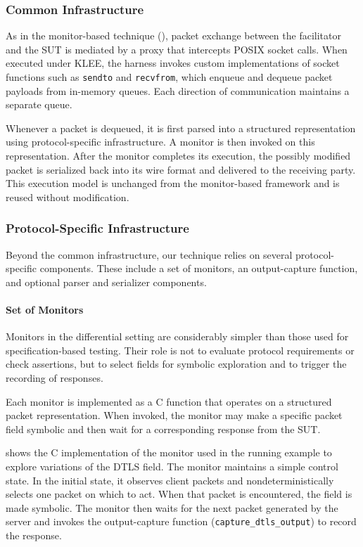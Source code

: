 \subsubsection{Common Infrastructure}\label{sec:paper3-common-infra}
As in the monitor-based technique (), packet exchange between the facilitator and the SUT is mediated by a proxy that intercepts POSIX socket calls.
When executed under KLEE, the harness invokes custom implementations of socket functions such as \texttt{sendto} and \texttt{recvfrom}, which enqueue and dequeue packet payloads from in-memory queues.
Each direction of communication maintains a separate queue.

Whenever a packet is dequeued, it is first parsed into a structured representation using protocol-specific infrastructure.
A monitor is then invoked on this representation.
After the monitor completes its execution, the possibly modified packet is serialized back into its wire format and delivered to the receiving party.
This execution model is unchanged from the monitor-based framework and is reused without modification.

\subsubsection{Protocol-Specific Infrastructure}
Beyond the common infrastructure, our technique relies on several protocol-specific components.
These include a set of monitors, an output-capture function, and optional parser and serializer components.

\paragraph{Set of Monitors}
Monitors in the differential setting are considerably simpler than those used for specification-based testing.
Their role is not to evaluate protocol requirements or check assertions, but to select fields for symbolic exploration and to trigger the recording of responses.

Each monitor is implemented as a C function that operates on a structured packet representation.
When invoked, the monitor may make a specific packet field symbolic and then wait for a corresponding response from the SUT.

 shows the C implementation of the monitor used in the running example to explore variations of the DTLS  field.
The monitor maintains a simple control state.
In the initial state, it observes client packets and nondeterministically selects one packet on which to act.
When that packet is encountered, the  field is made symbolic.
The monitor then waits for the next packet generated by the server and invokes the output-capture function (\texttt{capture\_dtls\_output}) to record the response.


